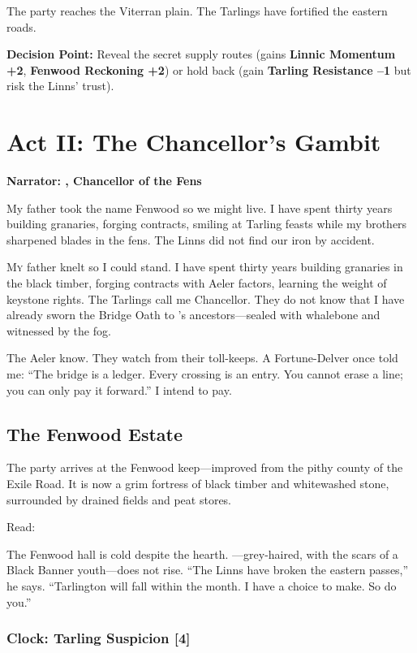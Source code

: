 \documentclass[11pt,a5paper]{book}
\newcommand{\clock}[1]{\textbf{[#1]}}
\begin{document}
The party reaches the Viterran plain. The Tarlings have fortified the eastern roads. 

\textbf{Decision Point:} Reveal the secret supply routes (gains \textbf{Linnic Momentum +2}, \textbf{Fenwood Reckoning +2}) or hold back (gain \textbf{Tarling Resistance --1} but risk the Linns' trust).

\clearpage

\chapter{Act II: The Chancellor's Gambit}
\textbf{Narrator: \aldric, Chancellor of the Fens}

\epigraph{My father took the name Fenwood so we might live. I have spent thirty years building granaries, forging contracts, smiling at Tarling feasts while my brothers sharpened blades in the fens. The Linns did not find our iron by accident.}{\aldric}

\lettrine{M}{y} father knelt so I could stand. I have spent thirty years building granaries in the black timber, forging contracts with Aeler factors, learning the weight of keystone rights. The Tarlings call me Chancellor. They do not know that I have already sworn the Bridge Oath to \soren's ancestors---sealed with whalebone and witnessed by the fog.

The Aeler know. They watch from their toll-keeps. A Fortune-Delver once told me: ``The bridge is a ledger. Every crossing is an entry. You cannot erase a line; you can only pay it forward.'' I intend to pay.

\section*{The Fenwood Estate}

The party arrives at the Fenwood keep---improved from the pithy county of the Exile Road. It is now a grim fortress of black timber and whitewashed stone, surrounded by drained fields and peat stores.

Read:
\begin{quoting}
The Fenwood hall is cold despite the hearth. \aldric{}---grey-haired, with the scars of a Black Banner youth---does not rise. ``The Linns have broken the eastern passes,'' he says. ``Tarlington will fall within the month. I have a choice to make. So do you.''
\end{quoting}

\subsection*{Clock: Tarling Suspicion \clock{4}}
\end{document}
